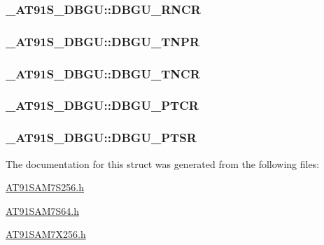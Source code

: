 \hypertarget{struct__AT91S__DBGU_16ea309864909b0a86967dd5b24fce65}{
\subsubsection{ {\bf \_\-AT91S\_\-DBGU::DBGU\_\-RNCR}}}
\label{struct__AT91S__DBGU_16ea309864909b0a86967dd5b24fce65}


\hypertarget{struct__AT91S__DBGU_cf86f053da2376a57fc17ed5d8d218af}{
\subsubsection{ {\bf \_\-AT91S\_\-DBGU::DBGU\_\-TNPR}}}
\label{struct__AT91S__DBGU_cf86f053da2376a57fc17ed5d8d218af}


\hypertarget{struct__AT91S__DBGU_0878db17a3bd20ab9998e3abafe13f2a}{
\subsubsection{ {\bf \_\-AT91S\_\-DBGU::DBGU\_\-TNCR}}}
\label{struct__AT91S__DBGU_0878db17a3bd20ab9998e3abafe13f2a}


\hypertarget{struct__AT91S__DBGU_1edfe16bbff4bebd75ec891cd83ae074}{
\subsubsection{ {\bf \_\-AT91S\_\-DBGU::DBGU\_\-PTCR}}}
\label{struct__AT91S__DBGU_1edfe16bbff4bebd75ec891cd83ae074}


\hypertarget{struct__AT91S__DBGU_05b94f8432b0a50446e30b4e3529f677}{
\subsubsection{ {\bf \_\-AT91S\_\-DBGU::DBGU\_\-PTSR}}}
\label{struct__AT91S__DBGU_05b94f8432b0a50446e30b4e3529f677}




The documentation for this struct was generated from the following files:\begin{CompactItemize}
\item 
\hyperlink{AT91SAM7S256_8h}{AT91SAM7S256.h}\item 
\hyperlink{AT91SAM7S64_8h}{AT91SAM7S64.h}\item 
\hyperlink{AT91SAM7X256_8h}{AT91SAM7X256.h}\end{CompactItemize}
